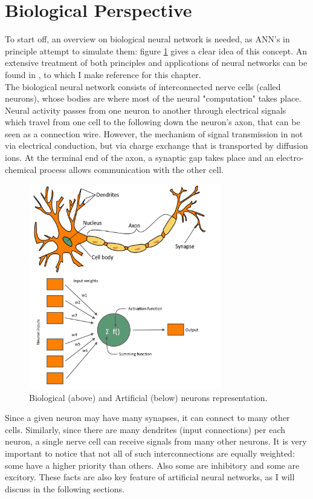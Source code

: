 \documentclass[%
    corpo=11pt,
    twoside,
    stile=classica,
    oldstyle,
    autoretitolo,
    tipotesi=magistrale,
    greek,
    evenboxes,
    english
]{toptesi}
\begin{document}
\section{Biological Perspective}
To start off, an overview on biological neural network is needed, as ANN's in principle attempt to simulate them: figure \ref{fig:artificialneuron} gives a clear idea of this concept. An extensive treatment of both principles and applications of neural networks can be found in \cite{graupe}, to which I make reference for this chapter. \\
The biological neural network consists of interconnected nerve cells (called neurons), whose bodies are where most of the neural "computation" takes place. Neural activity passes from one neuron to another through electrical signals which travel from one cell to the following down the neuron's axon, that can be seen as a connection wire. However, the mechanism of signal transmission in not via electrical conduction, but via charge exchange that is transported by diffusion ions. At the terminal end of the axon, a synaptic gap takes place and an electro-chemical process allows communication with the other cell. \\
\begin{figure}[h]
\centering
\includegraphics[width=0.75\textwidth]{pictures/neuron_biological_artificial.jpg}
\caption{Biological (above) and Artificial (below) neurons representation.}
\label{fig:artificialneuron}
\end{figure}
Since a given neuron may have many synapses, it can connect to many other cells. Similarly, since there are many dendrites (input connections) per each neuron, a single nerve cell can receive signals from many other neurons. It is very important to notice that not all of such interconnections are equally weighted: some have a higher priority than others. Also some are inhibitory and some are excitory. These facts are also key feature of artificial neural networks, as I will discuss in the following sections.
\newpage
\end{document}
